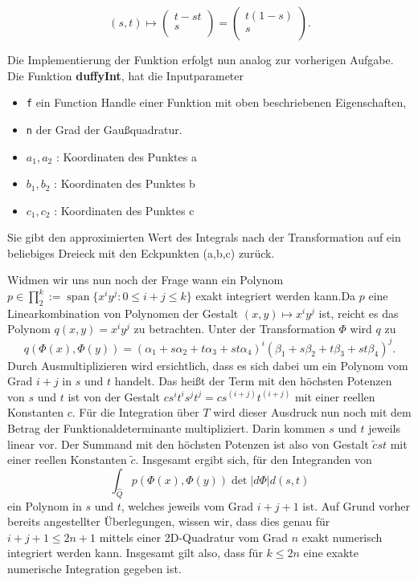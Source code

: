 \documentclass[a4paper,11pt,bibliography=totoc,listof=totoc,headinclude=true,cleardoublepage=empty,oneside]{scrbook}
\newcommand{\code}[1]{\texttt{\color{change}#1}}
\DeclareMathOperator*{\SPAN}{span}
\begin{document}
\begin{equation}
	(s,t) \mapsto  \left(
	\begin{array}{ccc}
	t-st\\
	s\\
	\end{array}
	\right) = \left(
	\begin{array}{ccc}
	t(1-s)\\
	s\\
	\end{array}
	\right).
\end{equation}

Die Implementierung der Funktion erfolgt nun analog zur vorherigen Aufgabe. 
Die Funktion \textbf{duffyInt}, hat die Inputparameter
\begin{itemize}
\item \code{f} ein Function Handle einer Funktion mit oben beschriebenen Eigenschaften,
\item \code{n} der Grad der Gaußquadratur.
\item \code{$a_1,a_2$} : Koordinaten des Punktes a
\item \code{$b_1,b_2$} : Koordinaten des Punktes b
\item \code{$c_1,c_2$} : Koordinaten des Punktes c
\end{itemize} 
Sie gibt den approximierten Wert des Integrals nach der Transformation auf ein beliebiges Dreieck mit den Eckpunkten (a,b,c) zurück.

{\color{change}
\lstset{ 
language=Matlab, 
showstringspaces=false}
 }




Widmen wir uns nun noch der Frage wann ein Polynom $ p \in \prod_{2}^k:=\SPAN\{x^iy^j:0 \leq i+j\leq k \} $ exakt integriert werden kann.Da $p$ eine Linearkombination von Polynomen der Gestalt $(x,y) \mapsto x^iy^j$ ist, reicht es das Polynom $q(x,y) = x^iy^j$ zu betrachten. Unter der Transformation $\Phi$ wird $q$ zu 
\begin{equation*}
	q(\Phi(x),\Phi(y)) = (\alpha_1+s\alpha_2+t\alpha_3+st\alpha_4)^i(\beta_1+s\beta_2+t\beta_3+st\beta_4)^j.
\end{equation*}
Durch Ausmultiplizieren wird ersichtlich, dass es sich dabei um ein Polynom vom Grad $i+j$ in $s$ und $t$ handelt. Das heißt der Term mit den höchsten Potenzen von $s$ und $t$ ist von der Gestalt $cs^it^is^jt^j = cs^{(i+j)}t^{(i+j)}$ mit einer reellen Konstanten $c$. Für die Integration über $T$ wird dieser Ausdruck nun noch mit dem Betrag der Funktionaldeterminante multipliziert. Darin kommen $s$ und $t$ jeweils linear vor. Der Summand mit den höchsten Potenzen ist also von Gestalt $\tilde{c}st$ mit einer reellen Konstanten $\tilde{c}$. Insgesamt ergibt sich, für den Integranden von 
\begin{equation*}
	\int_{\hat{Q}}^{} p(\Phi(x),\Phi(y)) \det|d\Phi| d(s,t)
\end{equation*}
ein Polynom in $s$ und $t$, welches jeweils vom Grad $i+j+1$ ist. Auf Grund vorher bereits angestellter Überlegungen, wissen wir, dass dies genau für $i+j+1 \leq 2n+1$ mittels einer 2D-Quadratur vom Grad $n$ exakt numerisch integriert werden kann. Insgesamt gilt also, dass für $k \leq 2n$ eine exakte numerische Integration gegeben ist. 
\end{document}
